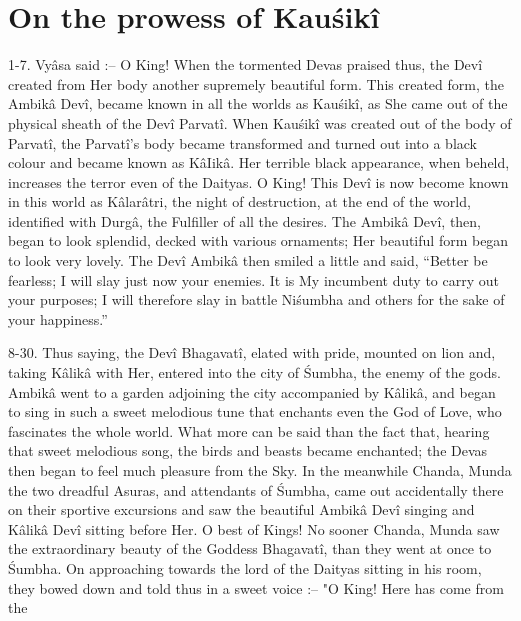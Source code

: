 ﻿\chapter{On the prowess of Kau\'sik\^i}

1-7. Vy\^asa said :-- O King! When the tormented Devas praised thus, the Dev\^i created from Her body another supremely beautiful form. This created form, the Ambik\^a Dev\^i, became known in all the worlds as Kau\'sik\^i, as She came out of the physical sheath of the Dev\^i Parvat\^i. When Kau\'sik\^i was created out of the body of Parvat\^i, the Parvat\^i's body became transformed and turned out into a black colour and became known as K\^aIik\^a. Her terrible black appearance, when beheld, increases the terror even of the Daityas. O King! This Dev\^i is now become known in this world as K\^alar\^atri, the night of destruction, at the end of the world, identified with Durg\^a, the Fulfiller of all the desires. The Ambik\^a Dev\^i, then, began to look splendid, decked with various ornaments; Her beautiful form began to look very lovely. The Dev\^i Ambik\^a then smiled a little and said, ``Better be fearless; I will slay just now your enemies. It is My incumbent duty to carry out your purposes; I will therefore slay in battle Ni\'sumbha and others for the sake of your happiness.''

8-30. Thus saying, the Dev\^i Bhagavat\^i, elated with pride, mounted on lion and, taking K\^alik\^a with Her, entered into the city of \'Sumbha, the enemy of the gods. Ambik\^a went to a garden adjoining the city accompanied by K\^alik\^a, and began to sing in such a sweet melodious tune that enchants even the God of Love, who fascinates the whole world. What more can be said than the fact that, hearing that sweet melodious song, the birds and beasts became enchanted; the Devas then began to feel much pleasure from the Sky. In the meanwhile Chanda, Munda the two dreadful Asuras, and attendants of \'Sumbha, came out accidentally there on their sportive excursions and saw the beautiful Ambik\^a Dev\^i singing and K\^alik\^a Dev\^i sitting before Her. O best of Kings! No sooner Chanda, Munda saw the extraordinary beauty of the Goddess Bhagavat\^i, than they went at once to \'Sumbha. On approaching towards the lord of the Daityas sitting in his room, they bowed down and told thus in a sweet voice :-- "O King! Here has come from the

